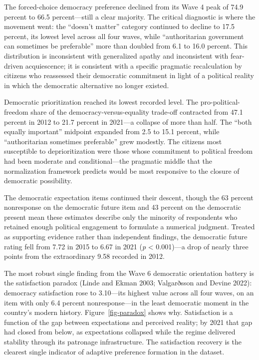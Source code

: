 \documentclass[
  12pt,
  letterpaper]{article}
\begin{document}
The forced-choice democracy preference declined from its Wave 4 peak of
74.9 percent to 66.5 percent---still a clear majority. The critical
diagnostic is where the movement went: the ``doesn't matter'' category
continued to decline to 17.5 percent, its lowest level across all four
waves, while ``authoritarian government can sometimes be preferable''
more than doubled from 6.1 to 16.0 percent. This distribution is
inconsistent with generalized apathy and inconsistent with fear-driven
acquiescence; it is consistent with a specific pragmatic recalculation
by citizens who reassessed their democratic commitment in light of a
political reality in which the democratic alternative no longer existed.

Democratic prioritization reached its lowest recorded level. The
pro-political-freedom share of the democracy-versus-equality trade-off
contracted from 47.1 percent in 2012 to 21.7 percent in 2021---a
collapse of more than half. The ``both equally important'' midpoint
expanded from 2.5 to 15.1 percent, while ``authoritarian sometimes
preferable'' grew modestly. The citizens most susceptible to
deprioritization were those whose commitment to political freedom had
been moderate and conditional---the pragmatic middle that the
normalization framework predicts would be most responsive to the closure
of democratic possibility.

The democratic expectation items continued their descent, though the 63
percent nonresponse on the democratic future item and 43 percent on the
democratic present mean these estimates describe only the minority of
respondents who retained enough political engagement to formulate a
numerical judgment. Treated as supporting evidence rather than
independent findings, the democratic future rating fell from 7.72 in
2015 to 6.67 in 2021 (\emph{p} \textless{} 0.001)---a drop of nearly
three points from the extraordinary 9.58 recorded in 2012.

The most robust single finding from the Wave 6 democratic orientation
battery is the satisfaction paradox (Linde and Ekman 2003; Valgarðsson
and Devine 2022): democracy satisfaction rose to 3.10---its highest
value across all four waves, on an item with only 6.4 percent
nonresponse---in the least democratic moment in the country's modern
history. Figure~\ref{fig-paradox} shows why. Satisfaction is a function
of the gap between expectations and perceived reality; by 2021 that gap
had closed from below, as expectations collapsed while the regime
delivered stability through its patronage infrastructure. The
satisfaction recovery is the clearest single indicator of adaptive
preference formation in the dataset.
\end{document}
